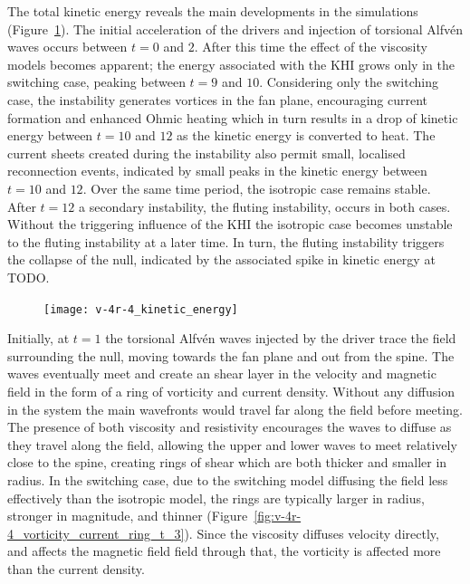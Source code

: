 The total kinetic energy reveals the main developments in the simulations (Figure~\ref{fig:v-4r-4_kinetic_energy}). The initial acceleration of the drivers and injection of torsional Alfv\'en waves occurs between $t=0$ and $2$. After this time the effect of the viscosity models becomes apparent; the energy associated with the KHI grows only in the switching case, peaking between $t=9$ and $10$. Considering only the switching case, the instability generates vortices in the fan plane, encouraging current formation and enhanced Ohmic heating which in turn results in a drop of kinetic energy between $t=10$ and $12$ as the kinetic energy is converted to heat. The current sheets created during the instability also permit small, localised reconnection events, indicated by small peaks in the kinetic energy between $t=10$ and $12$. Over the same time period, the isotropic case remains stable. After $t=12$ a secondary instability, the fluting instability, occurs in both cases. Without the triggering influence of the KHI the isotropic case becomes unstable to the fluting instability at a later time. In turn, the fluting instability triggers the collapse of the null, indicated by the associated spike in kinetic energy at TODO.

\begin{figure}[t]
  \centering
  \texttt{[image: v-4r-4\_kinetic\_energy]}
  \caption{}%
  \label{fig:v-4r-4_kinetic_energy}
\end{figure}

Initially, at $t=1$ the torsional Alfv\'en waves injected by the driver trace the field surrounding the null, moving towards the fan plane and out from the spine. The waves eventually meet and create an shear layer in the velocity and magnetic field in the form of a ring of vorticity and current density. Without any diffusion in the system the main wavefronts would travel far along the field before meeting. The presence of both viscosity and resistivity encourages the waves to diffuse as they travel along the field, allowing the upper and lower waves to meet relatively close to the spine, creating rings of shear which are both thicker and smaller in radius. In the switching case, due to the switching model diffusing the field less effectively than the isotropic model, the rings are typically larger in radius, stronger in magnitude, and thinner (Figure~\ref{fig:v-4r-4_vorticity_current_ring_t_3}). Since the viscosity diffuses velocity directly, and affects the magnetic field field through that, the vorticity is affected more than the current density.


